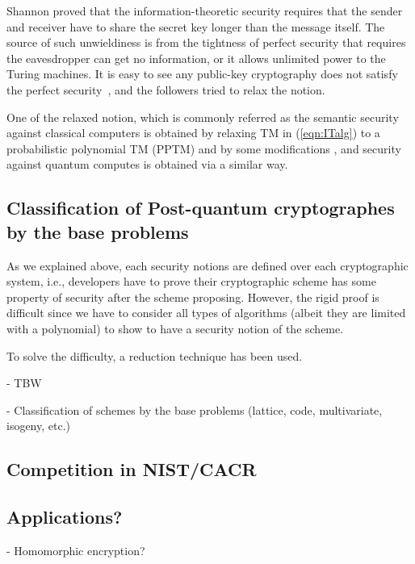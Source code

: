 Shannon proved that the information-theoretic security 
requires that the sender and receiver have to share 
the secret key longer than the message itself.
The source of such unwieldiness is from the tightness of perfect security that requires the eavesdropper can get no information, or it allows unlimited power to the Turing machines.
It is easy to see any public-key cryptography does not satisfy
the perfect security~\cite[Sect. 5.5.2]{GolEnc2}, 
and the followers tried to relax the notion.


One of the relaxed notion, which is commonly referred as the semantic security against classical computers is obtained by relaxing TM in (\ref{eqn:ITalg}) to a probabilistic polynomial TM (PPTM) and by some modifications \cite{...}, and security against quantum computes is obtained via a similar way.

\subsection{Classification of Post-quantum cryptographes by the base problems}

As we explained above, each security notions are defined over each cryptographic system, i.e., developers have to prove their cryptographic scheme has some property of security after the scheme proposing.
However, the rigid proof is difficult since we have to consider all types of algorithms (albeit they are limited with a polynomial) to show to have a  security notion of the scheme.

To solve the difficulty, a reduction technique has been used.

 - TBW
 
 - Classification of schemes by the base problems (lattice, code, multivariate, isogeny, etc.)

\subsection{Competition in NIST/CACR}


\subsection{Applications?}

 - Homomorphic encryption?




